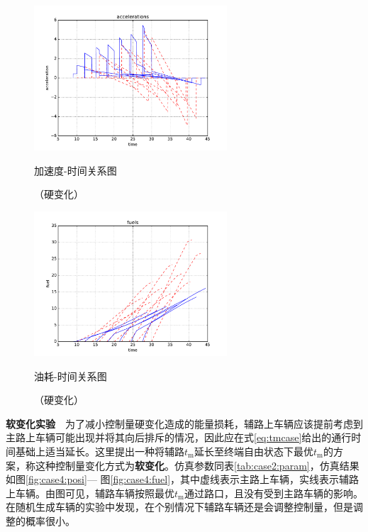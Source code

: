 \begin{figure}[htbp]
\begin{minipage}{0.48\textwidth}
  \centering
  \includegraphics[height=5.4cm]{figures/sim_case3/acc.pdf}
  \caption{加速度-时间关系图}
  \caption*{\small （硬变化）}
  \label{fig:case3:acc}
\end{minipage}\hfill
\begin{minipage}{0.48\textwidth}
  \centering
  \includegraphics[height=5.4cm]{figures/sim_case3/fuel.pdf}
  \caption{油耗-时间关系图}
  \caption*{\small （硬变化）}
  \label{fig:case3:fuel}
\end{minipage}
\end{figure}

\textbf{软变化实验}\ \
为了减小控制量硬变化造成的能量损耗，辅路上车辆应该提前考虑到主路上车辆可能出现并将其向后排斥的情况，因此应在式\ref{eq:tmcase}给出的通行时间基础上适当延长。这里提出一种将辅路$t_\mathrm{m}$延长至终端自由状态下最优$t_\mathrm{m}$的方案，称这种控制量变化方式为\textbf{软变化}。仿真参数同表\ref{tab:case2:param}，仿真结果如图\ref{fig:case4:posi}--- 图\ref{fig:case4:fuel}，其中虚线表示主路上车辆，实线表示辅路上车辆。由图可见，辅路车辆按照最优$t_\mathrm{m}$通过路口，且没有受到主路车辆的影响。在随机生成车辆的实验中发现，在个别情况下辅路车辆还是会调整控制量，但是调整的概率很小。

